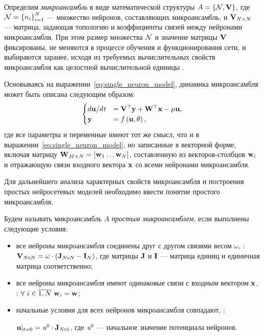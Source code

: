 
\begin{Definition*}
    Определим \textit{микроансамбль} в виде математической структуры $A = \left\{ \mathcal{N}, \mathrm{\mathbf{V}} \right\}$, где $\mathcal{N} = \left\{ n_{i} \right\}_{i=1}^{N} $ --- множество нейронов, составляющих микроансамбль, и $\mathrm{\mathbf{V}}_{N \times N}$ --- матрица, задающая топологию и коэффициенты связей между нейронами микроансамбля. При этом размер множества $\mathcal{N}$ и значение матрицы $\mathrm{\mathbf{V}}$ фиксированы, \ie не меняются в процессе обучения и функционирования сети, и выбираются заранее, исходя из требуемых вычислительных свойств микроансамбля как целостной вычислительной единицы .
\end{Definition*}

Основываясь на выражении~\eqref{eq:single_neuron_model}, динамика микроансамбля может быть описана следующим образом:
\begin{equation}
    \label{eq:microensemble_model}
    \begin{cases}
        d\mathrm{\mathbf{u}}/d\mathit{t} &= \mathrm{\mathbf{V}}^{\top} \mathrm{\mathbf{y}} + \mathrm{\mathbf{W}}^{\top} \mathrm{\mathbf{x}} - \mu \mathrm{\mathbf{u}}, \\
        \mathrm{\mathbf{y}}              &= f\left( \mathrm{\mathbf{u}}, \theta \right), \\
    \end{cases}
\end{equation}
где все параметры и переменные имеют тот же смысл, что и в выражении~\eqref{eq:single_neuron_model}, но записанные в векторной форме, включая матрицу $\mathrm{\mathbf{W}}_{M \times N} = \left[ \mathrm{\mathbf{w}}_{1} \ldots \mathrm{\mathbf{w}}_{N} \right]$, составленную из векторов-столбцов $\mathrm{\mathbf{w}}_{i}$ и отражающую связи входного вектора $\mathrm{\mathbf{x}}$ со всеми нейронами микроансамбля.

Для дальнейшего анализа характерных свойств микроансамбля и построения простых нейросетевых моделей необходимо ввести понятие простого микроансамбля.
\begin{Definition*}
    Будем называть микроансамбль $A$ \textit{простым микроансамблем}, если выполнены следующие условия:
    \begin{itemize}
        \item все нейроны микроансамбля соединены друг с другом связями весом $\omega$, \ie: $\mathrm{\mathbf{V}}_{N\!\times\!N} = \omega \cdot \left( \mathrm{\mathbf{J}}_{N\!\times\!N} - \mathrm{\mathbf{I}}_{N} \right)$, где матрицы $\mathrm{\mathbf{J}}$ и $\mathrm{\mathbf{I}}$  --- матрица единиц и единичная матрица соответственно;
        \item все нейроны микроансамбля имеют одинаковые связи с входным вектором $\mathrm{\mathbf{x}}$, \ie: $\forall\ i \in \overline{1,N}\ \mathrm{\mathbf{w}}_{i} = \mathrm{\mathbf{w}}$;
        \item начальные условия для всех нейронов микроансамбля совпадают, \ie: \par $\mathrm{\mathbf{u}}|_{t=0} = \mathit{u}^{0} \cdot \mathrm{\mathbf{J}}_{N\!\times\!1}$, где $\mathit{u}^{0}$ --- начальное значение потенциала нейронов.
    \end{itemize}
\end{Definition*}

